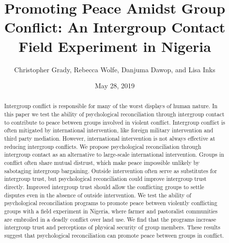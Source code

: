 \documentclass[11pt]{article}
\title{Promoting Peace Amidst Group Conflict: An Intergroup Contact Field
Experiment in Nigeria}
\author{
Christopher Grady, Rebecca Wolfe, Danjuma Dawop, and Lisa Inks
}
\date{May 28, 2019}
\begin{document}
\VerbatimFootnotes

%
%
%
%
%
%
%
%
%
%

\maketitle

\begin{abstract}

Intergroup conflict is responsible for many of the worst displays of human nature.  In this paper we test the ability of psychological reconciliation through intergroup contact to contribute to peace between groups involved in violent conflict.  Intergroup conflict is often mitigated by international intervention, like foreign military intervention and third party mediation.  However, international intervention is not always effective at reducing intergroup conflicts.  We propose psychological reconciliation through intergroup contact as an alternative to large-scale international intervention.  Groups in conflict often share mutual distrust, which make peace impossible unlikely by sabotaging intergroup bargaining.  Outside intervention often serve as substitutes for intergroup trust, but psychological reconciliation could improve intergroup trust directly.  Improved intergroup trust should allow the conflicting groups to settle disputes even in the absence of outside intervention.  We test the ability of psychological reconciliation programs to promote peace between violently conflicting groups with a field experiment in Nigeria, where farmer and pastoralist communities are embroiled in a deadly conflict over land use.  We find that the programs increase intergroup trust and perceptions of physical security of group members.  These results suggest that psychological reconciliation can promote peace between groups in conflict.

\end{abstract}
\end{document}
